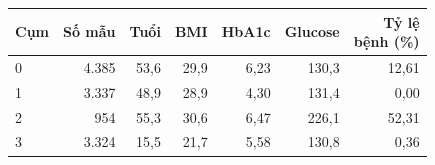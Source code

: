 \begin{tabular}{lrrrrrr}
\toprule
Cụm & Số mẫu & Tuổi & BMI & HbA1c & Glucose & \makecell[r]{Tỷ lệ\\bệnh (\%)} \\
\midrule
0 & 4{.}385 & 53{,}6 & 29{,}9 & 6{,}23 & 130{,}3 & 12{,}61 \\
1 & 3{.}337 & 48{,}9 & 28{,}9 & 4{,}30 & 131{,}4 & 0{,}00 \\
2 & 954 & 55{,}3 & 30{,}6 & 6{,}47 & 226{,}1 & 52{,}31 \\
3 & 3{.}324 & 15{,}5 & 21{,}7 & 5{,}58 & 130{,}8 & 0{,}36 \\
\bottomrule
\end{tabular}
